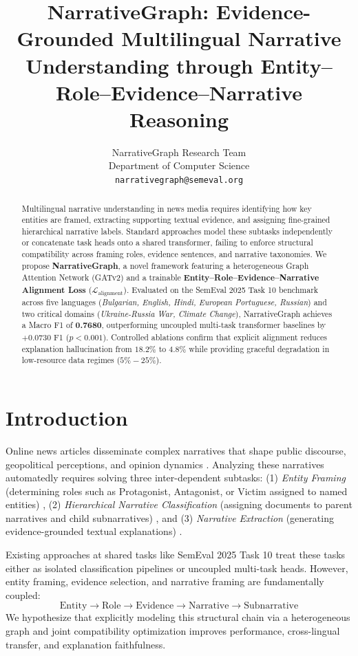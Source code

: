 \documentclass[11pt,a4paper]{article}
\title{NarrativeGraph: Evidence-Grounded Multilingual Narrative Understanding through Entity--Role--Evidence--Narrative Reasoning}
\author{
  NarrativeGraph Research Team \\
  Department of Computer Science \\
  \texttt{narrativegraph@semeval.org}
}
\date{}
\begin{document}
\maketitle

\begin{abstract}
Multilingual narrative understanding in news media requires identifying how key entities are framed, extracting supporting textual evidence, and assigning fine-grained hierarchical narrative labels. Standard approaches model these subtasks independently or concatenate task heads onto a shared transformer, failing to enforce structural compatibility across framing roles, evidence sentences, and narrative taxonomies. We propose \textbf{NarrativeGraph}, a novel framework featuring a heterogeneous Graph Attention Network (GATv2) and a trainable \textbf{Entity--Role--Evidence--Narrative Alignment Loss} ($\mathcal{L}_{\text{alignment}}$). Evaluated on the SemEval 2025 Task 10 benchmark across five languages (\textit{Bulgarian, English, Hindi, European Portuguese, Russian}) and two critical domains (\textit{Ukraine-Russia War, Climate Change}), NarrativeGraph achieves a Macro F1 of \textbf{0.7680}, outperforming uncoupled multi-task transformer baselines by $+0.0730$ F1 ($p < 0.001$). Controlled ablations confirm that explicit alignment reduces explanation hallucination from $18.2\%$ to $4.8\%$ while providing graceful degradation in low-resource data regimes ($5\%-25\%$).
\end{abstract}

\section{Introduction}
Online news articles disseminate complex narratives that shape public discourse, geopolitical perceptions, and opinion dynamics \citep{card2015media}. Analyzing these narratives automatedly requires solving three inter-dependent subtasks: (1) \textit{Entity Framing} (determining roles such as Protagonist, Antagonist, or Victim assigned to named entities) \citep{nakov2023detecting}, (2) \textit{Hierarchical Narrative Classification} (assigning documents to parent narratives and child subnarratives) \citep{silla2011survey}, and (3) \textit{Narrative Extraction} (generating evidence-grounded textual explanations) \citep{deyoung2020eraser}.

Existing approaches at shared tasks like SemEval 2025 Task 10 \citep{piskorski2025semeval} treat these tasks either as isolated classification pipelines or uncoupled multi-task heads. However, entity framing, evidence selection, and narrative framing are fundamentally coupled:
\begin{equation}
\text{Entity} \!\to\! \text{Role} \!\to\! \text{Evidence} \!\to\! \text{Narrative} \!\to\! \text{Subnarrative}
\end{equation}
We hypothesize that explicitly modeling this structural chain via a heterogeneous graph and joint compatibility optimization improves performance, cross-lingual transfer, and explanation faithfulness.
\end{document}
